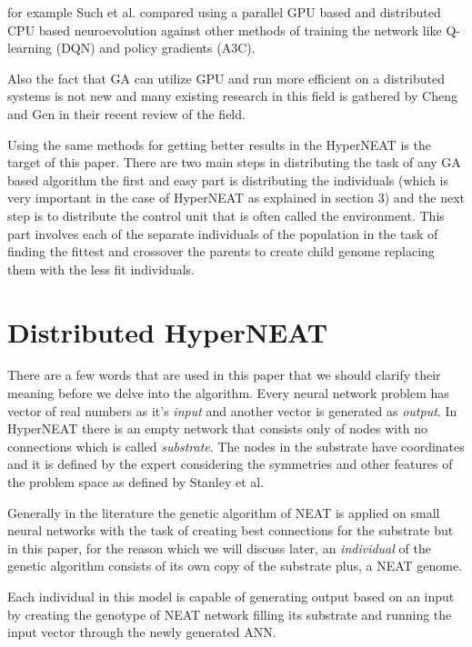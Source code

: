 \documentclass[twocolumn]{article}
\begin{document}
for example Such et al. compared using a parallel GPU based and distributed CPU based neuroevolution against other methods of training the network like Q-learning (DQN) and policy gradients (A3C). \cite{GA-GPU-Comparison}

Also the fact that GA can utilize GPU and run more efficient on a distributed systems is not new and many existing research in this field is gathered by Cheng and Gen in their recent review of the field. \cite{GA-GPU-Review}

Using the same methods for getting better results in the HyperNEAT is the target of this paper. There are two main steps in distributing the task of any GA based algorithm the first and easy part is distributing the individuals (which is very important in the case of HyperNEAT as explained in section 3) and the next step is to distribute the control unit that is often called the environment. This part involves each of the separate individuals of the population in the task of finding the fittest and crossover the parents to create child genome replacing them with the less fit individuals.


\section{Distributed HyperNEAT}
\label{section:main}
There are a few words that are used in this paper that we should clarify their meaning before we delve into the algorithm. Every neural network problem has vector of real numbers as it's \textit{input} and another vector is generated as \textit{output}. In HyperNEAT there is an empty network that consists only of nodes with no connections which is called \textit{substrate}. The nodes in the substrate have coordinates and it is defined by the expert considering the symmetries and other features of the problem space as defined by Stanley et al. \cite{originalHyperNEAT}

Generally in the literature the genetic algorithm of NEAT is applied on small neural networks with the task of creating best connections for the substrate but in this paper, for the reason which we will discuss later, an \textit{individual} of the genetic algorithm consists of its own copy of the substrate plus, a NEAT genome.

Each individual in this model is capable of generating output based on an input by creating the genotype of NEAT network filling its substrate and running the input vector through the newly generated ANN.
\end{document}
